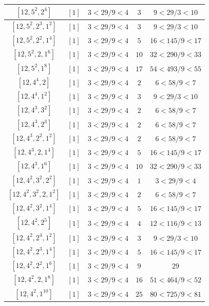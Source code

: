 \documentclass{article}%
\begin{document}
\begin{center}
\begin{longtable}{||c|c|c|c|c||}
$[12, 5^{2}, 2^{4}]$ & $[1]$ & $3 < 29/9 < 4$ & $3$ & $9 < 29/3 < 10$ \\ \hline 
$[12, 5^{2}, 2^{3}, 1^{2}]$ & $[1]$ & $3 < 29/9 < 4$ & $3$ & $9 < 29/3 < 10$ \\ \hline 
$[12, 5^{2}, 2^{2}, 1^{4}]$ & $[1]$ & $3 < 29/9 < 4$ & $5$ & $16 < 145/9 < 17$ \\ \hline 
$[12, 5^{2}, 2, 1^{6}]$ & $[1]$ & $3 < 29/9 < 4$ & $10$ & $32 < 290/9 < 33$ \\ \hline 
$[12, 5^{2}, 1^{8}]$ & $[1]$ & $3 < 29/9 < 4$ & $17$ & $54 < 493/9 < 55$ \\ \hline 
$[12, 4^{4}, 2]$ & $[1]$ & $3 < 29/9 < 4$ & $2$ & $6 < 58/9 < 7$ \\ \hline 
$[12, 4^{4}, 1^{2}]$ & $[1]$ & $3 < 29/9 < 4$ & $3$ & $9 < 29/3 < 10$ \\ \hline 
$[12, 4^{3}, 3^{2}]$ & $[1]$ & $3 < 29/9 < 4$ & $2$ & $6 < 58/9 < 7$ \\ \hline 
$[12, 4^{3}, 2^{3}]$ & $[1]$ & $3 < 29/9 < 4$ & $2$ & $6 < 58/9 < 7$ \\ \hline 
$[12, 4^{3}, 2^{2}, 1^{2}]$ & $[1]$ & $3 < 29/9 < 4$ & $2$ & $6 < 58/9 < 7$ \\ \hline 
$[12, 4^{3}, 2, 1^{4}]$ & $[1]$ & $3 < 29/9 < 4$ & $5$ & $16 < 145/9 < 17$ \\ \hline 
$[12, 4^{3}, 1^{6}]$ & $[1]$ & $3 < 29/9 < 4$ & $10$ & $32 < 290/9 < 33$ \\ \hline 
$[12, 4^{2}, 3^{2}, 2^{2}]$ & $[1]$ & $3 < 29/9 < 4$ & $1$ & $3 < 29/9 < 4$ \\ \hline 
$[12, 4^{2}, 3^{2}, 2, 1^{2}]$ & $[1]$ & $3 < 29/9 < 4$ & $2$ & $6 < 58/9 < 7$ \\ \hline 
$[12, 4^{2}, 3^{2}, 1^{4}]$ & $[1]$ & $3 < 29/9 < 4$ & $5$ & $16 < 145/9 < 17$ \\ \hline 
$[12, 4^{2}, 2^{5}]$ & $[1]$ & $3 < 29/9 < 4$ & $4$ & $12 < 116/9 < 13$ \\ \hline 
$[12, 4^{2}, 2^{4}, 1^{2}]$ & $[1]$ & $3 < 29/9 < 4$ & $3$ & $9 < 29/3 < 10$ \\ \hline 
$[12, 4^{2}, 2^{3}, 1^{4}]$ & $[1]$ & $3 < 29/9 < 4$ & $5$ & $16 < 145/9 < 17$ \\ \hline 
$[12, 4^{2}, 2^{2}, 1^{6}]$ & $[1]$ & $3 < 29/9 < 4$ & $9$ & $29$ \\ \hline 
$[12, 4^{2}, 2, 1^{8}]$ & $[1]$ & $3 < 29/9 < 4$ & $16$ & $51 < 464/9 < 52$ \\ \hline 
$[12, 4^{2}, 1^{10}]$ & $[1]$ & $3 < 29/9 < 4$ & $25$ & $80 < 725/9 < 81$ \\ \hline 

\end{longtable}
\end{center}
\end{document}
